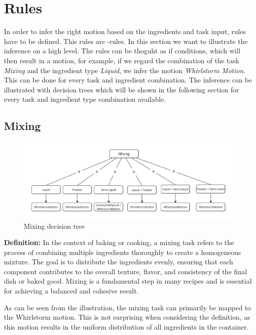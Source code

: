 \section{Rules}
In order to infer the right motion based on the ingredients and task input, rules have to be defined. This rules are -rules.
In this section we want to illustrate the inference on a high level.
The rules can be thoguht as if conditions, which will then result in a motion, 
for example, if we regard the combination of the task \textit{Mixing} and the ingredient type \textit{Liquid}, we infer the motion \textit{Whirlstorm Motion}. 
This can be done for every task and ingredient combination. 
The inference can be illustrated with decision trees which will be shown in the following section for every task and ingredient type combination available. 

\subsection{Mixing}
\begin{figure}[H]
\includegraphics[scale=0.25]{Graphics/MixingDecisionTree.jpg}
\caption{Mixing decision tree}
\end{figure}
\textbf{Definition:} In the context of baking or cooking, a mixing task refers to the process of combining multiple ingredients thoroughly to create a homogeneous mixture. The goal is to distribute the ingredients evenly, ensuring that each component contributes to the overall texture, flavor, and consistency of the final dish or baked good. Mixing is a fundamental step in many recipes and is essential for achieving a balanced and cohesive result.


As can be seen from the illustration, the mixing task can primarily be mapped to the Whirlstorm motion. This is not surprising when considering the definition, as this motion results in the uniform distribution of all ingredients in the container.
